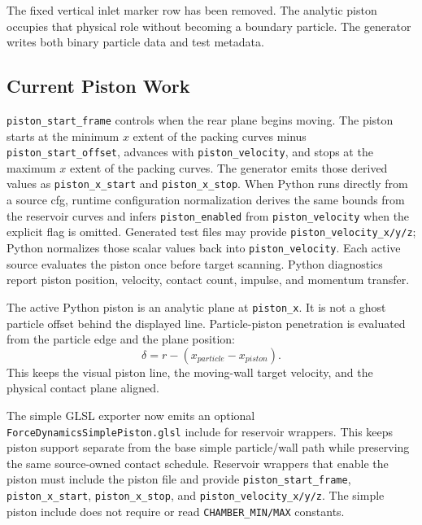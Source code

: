 The fixed vertical inlet marker row has been removed.  The analytic piston
occupies that physical role without becoming a boundary particle.  The
generator writes both binary particle data and test metadata.

\subsection{Current Piston Work}

\texttt{piston\_start\_frame} controls when the rear plane begins moving.
The piston starts at the minimum \(x\) extent of the packing curves minus
\texttt{piston\_start\_offset}, advances with
\texttt{piston\_velocity}, and stops at the maximum \(x\) extent of the
packing curves.  The generator emits those derived values as
\texttt{piston\_x\_start} and \texttt{piston\_x\_stop}.  When Python runs
directly from a source cfg, runtime configuration normalization derives the
same bounds from the reservoir curves and infers \texttt{piston\_enabled}
from \texttt{piston\_velocity} when the explicit flag is omitted.  Generated
test files may provide \texttt{piston\_velocity\_x/y/z}; Python normalizes
those scalar values back into \texttt{piston\_velocity}.  Each active source
evaluates the piston once before target scanning.  Python diagnostics report
piston position, velocity, contact count, impulse, and momentum transfer.

The active Python piston is an analytic plane at \texttt{piston\_x}.  It is
not a ghost particle offset behind the displayed line.  Particle-piston
penetration is evaluated from the particle edge and the plane position:
\[
    \delta = r - (x_{particle}-x_{piston}).
\]
This keeps the visual piston line, the moving-wall target velocity, and the
physical contact plane aligned.

The simple GLSL exporter now emits an optional
\texttt{ForceDynamicsSimplePiston.glsl} include for reservoir wrappers.  This
keeps piston support separate from the base simple particle/wall path while
preserving the same source-owned contact schedule.  Reservoir wrappers that
enable the piston must include the piston file and provide
\texttt{piston\_start\_frame}, \texttt{piston\_x\_start},
\texttt{piston\_x\_stop}, and \texttt{piston\_velocity\_x/y/z}.  The simple
piston include does not require or read \texttt{CHAMBER\_MIN/MAX} constants.
